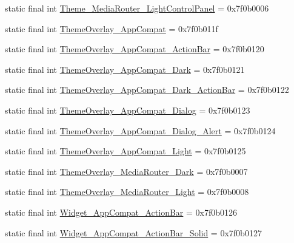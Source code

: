 \begin{CompactItemize}
\item 
static final int \hyperlink{classandroid_1_1support_1_1v7_1_1mediarouter_1_1_r_1_1style_6f4f029fdb276dc2141fd16d05250bf2}{Theme\_\-MediaRouter\_\-LightControlPanel} = 0x7f0b0006
\item 
static final int \hyperlink{classandroid_1_1support_1_1v7_1_1mediarouter_1_1_r_1_1style_072aadf3ac63e67a55e3a9a7a41b6e74}{ThemeOverlay\_\-AppCompat} = 0x7f0b011f
\item 
static final int \hyperlink{classandroid_1_1support_1_1v7_1_1mediarouter_1_1_r_1_1style_50a61706a3e1dbfe768d56d14939bd15}{ThemeOverlay\_\-AppCompat\_\-ActionBar} = 0x7f0b0120
\item 
static final int \hyperlink{classandroid_1_1support_1_1v7_1_1mediarouter_1_1_r_1_1style_284040133150651a2c9135d66ebb3f9a}{ThemeOverlay\_\-AppCompat\_\-Dark} = 0x7f0b0121
\item 
static final int \hyperlink{classandroid_1_1support_1_1v7_1_1mediarouter_1_1_r_1_1style_fdaef448667653cdba56eec197599299}{ThemeOverlay\_\-AppCompat\_\-Dark\_\-ActionBar} = 0x7f0b0122
\item 
static final int \hyperlink{classandroid_1_1support_1_1v7_1_1mediarouter_1_1_r_1_1style_cc57484964527447ff583957e3fb65b1}{ThemeOverlay\_\-AppCompat\_\-Dialog} = 0x7f0b0123
\item 
static final int \hyperlink{classandroid_1_1support_1_1v7_1_1mediarouter_1_1_r_1_1style_0dd277335f0a6b6f585c947333a449dc}{ThemeOverlay\_\-AppCompat\_\-Dialog\_\-Alert} = 0x7f0b0124
\item 
static final int \hyperlink{classandroid_1_1support_1_1v7_1_1mediarouter_1_1_r_1_1style_126af033da3f8c66142560bcac35f875}{ThemeOverlay\_\-AppCompat\_\-Light} = 0x7f0b0125
\item 
static final int \hyperlink{classandroid_1_1support_1_1v7_1_1mediarouter_1_1_r_1_1style_7883169d1f597647322667d0abe15435}{ThemeOverlay\_\-MediaRouter\_\-Dark} = 0x7f0b0007
\item 
static final int \hyperlink{classandroid_1_1support_1_1v7_1_1mediarouter_1_1_r_1_1style_b21d3a2bd496443d2080913843f81b61}{ThemeOverlay\_\-MediaRouter\_\-Light} = 0x7f0b0008
\item 
static final int \hyperlink{classandroid_1_1support_1_1v7_1_1mediarouter_1_1_r_1_1style_3d54d75c3c003712da141e2bd9277986}{Widget\_\-AppCompat\_\-ActionBar} = 0x7f0b0126
\item 
static final int \hyperlink{classandroid_1_1support_1_1v7_1_1mediarouter_1_1_r_1_1style_d2e96ee36bc46ef9b2954e595022354d}{Widget\_\-AppCompat\_\-ActionBar\_\-Solid} = 0x7f0b0127

\end{CompactItemize}
